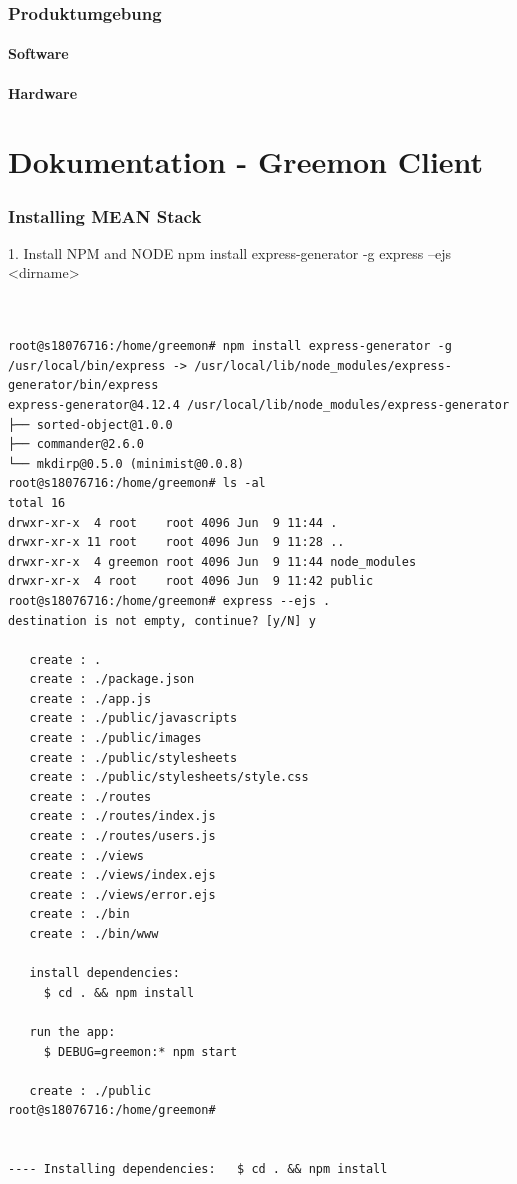 \documentclass[pointlessnumbers]{scrartcl}
\begin{document}
\section{Produktumgebung}
\subsection{Software}
%
%
\subsection{Hardware}
%
%






\newpage
\part{Dokumentation - Greemon Client}
\section{Installing MEAN Stack}
    1. Install NPM and NODE
    npm install express-generator -g
    express --ejs <dirname>

\begin{lstlisting}


root@s18076716:/home/greemon# npm install express-generator -g
/usr/local/bin/express -> /usr/local/lib/node_modules/express-generator/bin/express
express-generator@4.12.4 /usr/local/lib/node_modules/express-generator
├── sorted-object@1.0.0
├── commander@2.6.0
└── mkdirp@0.5.0 (minimist@0.0.8)
root@s18076716:/home/greemon# ls -al 
total 16
drwxr-xr-x  4 root    root 4096 Jun  9 11:44 .
drwxr-xr-x 11 root    root 4096 Jun  9 11:28 ..
drwxr-xr-x  4 greemon root 4096 Jun  9 11:44 node_modules
drwxr-xr-x  4 root    root 4096 Jun  9 11:42 public
root@s18076716:/home/greemon# express --ejs .
destination is not empty, continue? [y/N] y

   create : .
   create : ./package.json
   create : ./app.js
   create : ./public/javascripts
   create : ./public/images
   create : ./public/stylesheets
   create : ./public/stylesheets/style.css
   create : ./routes
   create : ./routes/index.js
   create : ./routes/users.js
   create : ./views
   create : ./views/index.ejs
   create : ./views/error.ejs
   create : ./bin
   create : ./bin/www

   install dependencies:
     $ cd . && npm install

   run the app:
     $ DEBUG=greemon:* npm start

   create : ./public
root@s18076716:/home/greemon# 


---- Installing dependencies:   $ cd . && npm install



\end{lstlisting}






\end{document}
